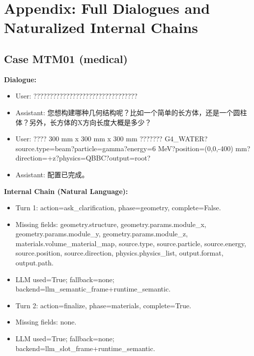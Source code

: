 \documentclass[11pt]{ctexart}
\begin{document}
\section{Appendix: Full Dialogues and Naturalized Internal Chains}
\subsection{Case MTM01 (medical)}
\textbf{Dialogue:}
\begin{itemize}
\item User: ????????????????????????????????
\item Assistant: 您想构建哪种几何结构呢？比如一个简单的长方体，还是一个圆柱体？另外，长方体的X方向长度大概是多少？
\item User: ???? 300 mm x 300 mm x 300 mm ??????? G4\_WATER?source.type=beam?particle=gamma?energy=6 MeV?position=(0,0,-400) mm?direction=+z?physics=QBBC?output=root?
\item Assistant: 配置已完成。
\end{itemize}
\textbf{Internal Chain (Natural Language):}
\begin{itemize}
\item Turn 1: action=ask\_clarification, phase=geometry, complete=False.
\item Missing fields: geometry.structure, geometry.params.module\_x, geometry.params.module\_y, geometry.params.module\_z, materials.volume\_material\_map, source.type, source.particle, source.energy, source.position, source.direction, physics.physics\_list, output.format, output.path.
\item LLM used=True; fallback=none; backend=llm\_semantic\_frame+runtime\_semantic.
\item Turn 2: action=finalize, phase=materials, complete=True.
\item Missing fields: none.
\item LLM used=True; fallback=none; backend=llm\_slot\_frame+runtime\_semantic.
\end{itemize}
\end{document}
